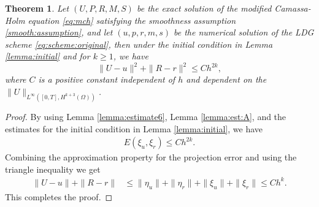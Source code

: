 \documentclass[11pt]{article}
\newtheorem{theorem}{Theorem}[section]
\numberwithin{equation}{section}
\begin{document}
\begin{theorem}
Let $(U, P, R, M,S)$ be the exact solution of the modified Camassa-Holm equation \eqref{eq:mch} satisfying the smoothness assumption \eqref{smooth:assumption},
and let $(u, p, r, m,s)$ be the numerical solution of the LDG scheme \eqref{eq:scheme:original}, then under the initial condition in Lemma \ref{lemma:initial} and for $k\geq1$, we have
	\begin{equation}\label{eq:est:mian}
		\|U-u\|^2+\| R-r\|^2 \le C h^{2k},
	\end{equation}
where $C$ is a positive constant independent of $h$ and dependent on the $\|U\|_{L^{\infty}([0,T], H^{k+3}(\Omega))}$.
\end{theorem}
\begin{proof}
By using Lemma \ref{lemma:estimate6}, Lemma \ref{lemma:est:A}, and the estimates for the initial condition in Lemma \ref{lemma:initial}, we have
\begin{align*}
		E(\xi_u, \xi_r) \le C h^{2k}.
\end{align*}
Combining the approximation property for the projection error and using the triangle inequality we get
\begin{align*}
		\|U-u\| +\| R-r\| &\leq \|\eta_u\|+\|\eta_r\|+\|\xi_u\|+\|\xi_r\|\leq Ch^{k}.
\end{align*}
This completes the proof.
\end{proof}


\end{document}
